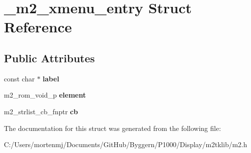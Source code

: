 \hypertarget{struct__m2__xmenu__entry}{\section{\-\_\-m2\-\_\-xmenu\-\_\-entry Struct Reference}
\label{struct__m2__xmenu__entry}
}
\subsection*{Public Attributes}
\begin{DoxyCompactItemize}
\item 
\hypertarget{struct__m2__xmenu__entry_aab0cfc81925dd090901b1ccde1ffd4d3}{const char $\ast$ {\bfseries label}}\label{struct__m2__xmenu__entry_aab0cfc81925dd090901b1ccde1ffd4d3}

\item 
\hypertarget{struct__m2__xmenu__entry_af2bce41d4b2dd49ec72c3c786ff19c3f}{m2\-\_\-rom\-\_\-void\-\_\-p {\bfseries element}}\label{struct__m2__xmenu__entry_af2bce41d4b2dd49ec72c3c786ff19c3f}

\item 
\hypertarget{struct__m2__xmenu__entry_a320c44085cebac6b2d4488a2627026a7}{m2\-\_\-strlist\-\_\-cb\-\_\-fnptr {\bfseries cb}}\label{struct__m2__xmenu__entry_a320c44085cebac6b2d4488a2627026a7}

\end{DoxyCompactItemize}


The documentation for this struct was generated from the following file\-:\begin{DoxyCompactItemize}
\item 
C\-:/\-Users/mortenmj/\-Documents/\-Git\-Hub/\-Byggern/\-P1000/\-Display/m2tklib/m2.\-h\end{DoxyCompactItemize}
